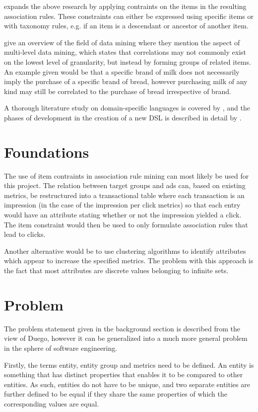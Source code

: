\documentclass[a4paper]{article}
\begin{document}
\citet{Srikant1997} expands the above research by applying contraints on the items in the resulting association rules. These constraints can either be expressed using specific items or with taxonomy rules, e.g. if an item is a descendant or ancestor of another item.

\citet{Chen1996} give an overview of the field of data mining where they mention the aspect of multi-level data mining, which states that correlations may not commonly exist on the lowest level of granularity, but instead by forming groups of related items. An example given would be that a specific brand of milk does not necessarily imply the purchase of a specific brand of bread, however purchasing milk of any kind may still be correlated to the purchase of bread irrespective of brand.

A thorough literature study on domain-specific languages is covered by \citet{Deursen2000}, and the phases of development in the creation of a new DSL is described in detail by \citet{Mernik2005}.

\section{Foundations}

The use of item contraints in association rule mining \citep{Srikant1997} can most likely be used for this project. The relation between target groups and ads can, based on existing metrics, be restructured into a transactional table where each transaction is an impression (in the case of the impression per click metrics) so that each entry would have an attribute stating whether or not the impression yielded a click. The item constraint would then be used to only formulate association rules that lead to clicks.

Another alternative would be to use clustering algorithms to identify attributes which appear to increase the specified metrics. The problem with this approach is the fact that most attributes are discrete values belonging to infinite sets.

\section{Problem}
The problem statement given in the background section is described from the view of Duego, however it can be generalized into a much more general problem in the sphere of software engineering.

Firstly, the terms entity, entity group and metrics need to be defined. An entity is something that has distinct properties that enables it to be compared to other entities. As such, entities do not have to be unique, and two separate entities are further defined to be equal if they share the same properties of which the corresponding values are equal.
\end{document}
